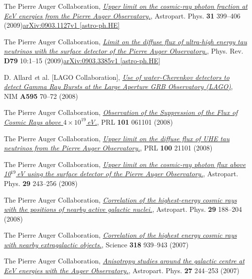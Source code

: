 \documentclass[11pt, a4paper]{article}
\newcommand{\years}[1]{\marginnote{\scriptsize #1}}
\begin{document}
\years{2009}The Pierre Auger Collaboration,
\href{http://dx.doi.org/10.1016/j.astropartphys.2009.04.003}{\emph{Upper limit
on the cosmic-ray photon fraction at EeV energies from the Pierre Auger
Observatory.}}, Astropart. Phys. {\bf 31} 399--406
(2009)\href{http://arxiv.org/abs/0903.1127/}{arXiv:0903.1127v1 [astro-ph.HE]}

\years{2009}The Pierre Auger Collaboration,
\href{http://dx.doi.org/10.1103/PhysRevD.79.102001}{\emph{Limit on the diffuse
flux of ultra-high energy tau neutrinos with the surface detector of the Pierre
Auger Observatory.}}, Phys. Rev. {\bf D79} 10:1--15
(2009)\href{http://arxiv.org/abs/0903.3385/}{arXiv:0903.3385v1 [astro-ph.HE]}

\years{2008}D. Allard {\emph et al.} [LAGO Collaboration], \href{http://dx.doi.org/10.1016/j.nima.2008.07.041}{\emph{Use of water-Cherenkov detectors to detect Gamma Ray Bursts at the Large Aperture GRB Observatory (LAGO)}}, NIM {\bf A595} 70--72 (2008)

\years{2008}The Pierre Auger Collaboration, \href{http://dx.doi.org/10.1103/PhysRevLett.101.061101}{\emph{Observation of the Suppression of the Flux of Cosmic Rays above $4\times10^{19}$\,eV.}}, PRL {\bf 101} 061101 (2008)

\years{2008}The Pierre Auger Collaboration, \href{http://dx.doi.org/10.1103/PhysRevLett.100.211101}{\emph{Upper limit on the diffuse flux of UHE tau neutrinos from the Pierre Auger Observatory.}}, PRL {\bf 100} 21101 (2008)


\years{2008}The Pierre Auger Collaboration, \href{http://dx.doi.org/10.1016/j.astropartphys.2008.01.003}{\emph{Upper limit on the cosmic-ray photon flux above 10$^{19}$\,eV using the surface detector of the Pierre Auger Observatory.}}, Astropart. Phys. {\bf 29} 243--256 (2008)

\years{2008}The Pierre Auger Collaboration, \href{http://dx.doi.org/10.1016/j.astropartphys.2008.01.002}{\emph{Correlation of the highest-energy cosmic rays with the positions of nearby active galactic nuclei.}}, Astropart. Phys. {\bf 29} 188--204 (2008)

\years{2007}The Pierre Auger Collaboration, \href{http://dx.doi.org/10.1126/science.1151124}{\emph{Correlation of the highest energy cosmic rays with nearby extragalactic objects.}}, Science {\bf 318} 939--943 (2007)

\years{2007}The Pierre Auger Collaboration, \href{http://dx.doi.org/10.1016/j.astropartphys.2006.11.002}{\emph{Anisotropy studies around the galactic centre at EeV energies with the Auger Observatory.}},  Astropart. Phys. {\bf 27} 244--253 (2007)
\end{document}
